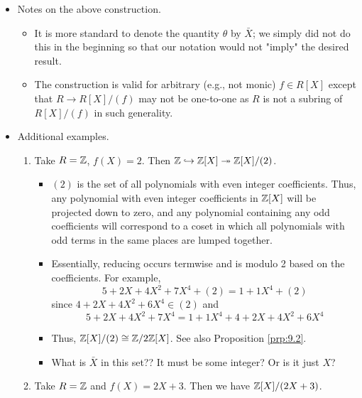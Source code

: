 \documentclass[../notes.tex]{subfiles}
\begin{document}
\begin{itemize}
    \begin{proof}
        Take $A=R[X]/(f(X))$ and put $\theta=\pi(X)$.
    \end{proof}
    \item Notes on the above construction.
    \begin{itemize}
        \item It is more standard to denote the quantity $\theta$ by $\bar{X}$; we simply did not do this in the beginning so that our notation would not "imply" the desired result.
        \item The construction is valid for arbitrary (e.g., not monic) $f\in R[X]$ except that $R\to R[X]/(f)$ may not be one-to-one as $R$ is not a subring of $R[X]/(f)$ in such generality.
    \end{itemize}
    \item Additional examples.
    \begin{enumerate}
        \item Take $R=\mathbb{Z}$, $f(X)=2$. Then $\mathbb{Z}\hookrightarrow\mathbb{Z}[X]\twoheadrightarrow\mathbb{Z}[X]/(2)$.
        \begin{itemize}
            \item $(2)$ is the set of all polynomials with even integer coefficients. Thus, any polynomial with even integer coefficients in $\mathbb{Z}[X]$ will be projected down to zero, and any polynomial containing any odd coefficients will correspond to a coset in which all polynomials with odd terms in the same places are lumped together.
            \item Essentially, reducing occurs termwise and is modulo 2 based on the coefficients. For example,
            \begin{equation*}
                5+2X+4X^2+7X^4+(2) = 1+1X^4+(2)
            \end{equation*}
            since $4+2X+4X^2+6X^4\in(2)$ and
            \begin{equation*}
                5+2X+4X^2+7X^4 = 1+1X^4+4+2X+4X^2+6X^4
            \end{equation*}
            \item Thus, $\mathbb{Z}[X]/(2)\cong\mathbb{Z}/2\mathbb{Z}[X]$. See also Proposition \ref{prp:9.2}.
            \item What is $\bar{X}$ in this set?? It must be some integer? Or is it just $X$?
        \end{itemize}
        \item Take $R=\mathbb{Z}$ and $f(X)=2X+3$. Then we have $\mathbb{Z}[X]/(2X+3)$.
        \begin{itemize}

\end{itemize}
\end{enumerate}
\end{itemize}
\end{document}
